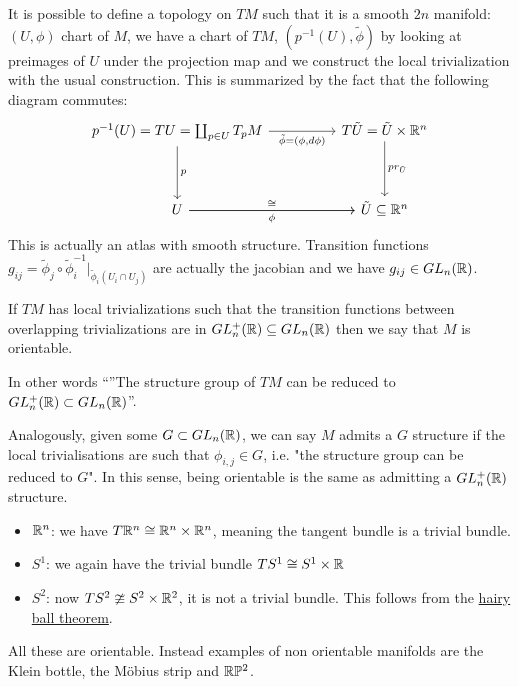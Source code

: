 \noindent It is possible to define a topology on $TM$ such that it is a smooth $2n$ manifold: $(U,\phi)$ chart of $M$, we have a chart of $TM$, $(p^{-1}(U),\tilde\phi)$ by looking at preimages of $U$ under the projection map and we construct the local trivialization with the usual construction. 
This is summarized by the fact that the following diagram commutes:
\[\begin{tikzcd}
    {p^{-1}(U)=TU=\coprod_{p\in U}T_pM} && {T\tilde U=\tilde U\times\R^n} \\
    \\
    U && {\tilde U\subseteq\R^n}
    \arrow["p", from=1-1, to=3-1]
    \arrow["{\tilde\phi=(\phi,d\phi)}"', from=1-1, to=1-3]
    \arrow["pr_{\tilde U}", from=1-3, to=3-3]
    \arrow["\phi"', from=3-1, to=3-3]
    \arrow["\cong", from=3-1, to=3-3]
\end{tikzcd}\]
This is actually an atlas with smooth structure. Transition functions $g_{ij} = \tilde \phi_j \circ \tilde\phi_i^{-1}|_{\tilde \phi_i(U_i \cap U_j)}$ are actually the jacobian and we have $g_{ij} \in GL_n(\mathbb{R})$. 

\begin{defn}
    If $TM$ has local trivializations such that the transition functions between overlapping trivializations are in $ GL_n^+(\mathbb{R})\subseteq GL_n(\mathbb{R})$ then we say that $M$ is orientable.

    \noindent In other words ``''The structure group of $TM$ can be reduced to $GL_n^+ (\mathbb{R}) \subset GL_n(\mathbb{R})$''.
    
    \noindent Analogously, given some $G \subset GL_n(\mathbb{R})$, we can say $M$ admits a $G$ structure if the local trivialisations are such that $\phi_{i,j} \in G$, i.e. "the structure group can be reduced to $G$". In this sense, being orientable is the same as admitting a $GL_n^+ (\mathbb{R})$ structure.

\end{defn}


\begin{ex}
\hfill
    \begin{itemize}
        \item $\mathbb{R}^n$: we have $T\mathbb{R}^n \cong \mathbb{R}^n \times \mathbb{R}^n$, meaning the tangent bundle is a trivial bundle.
        \item $S^1$: we again have the trivial bundle $TS^1 \cong S^1 \times \mathbb{R}$
        \item $S^2$: now $TS^2 \ncong S^2 \times \mathbb{R}^2$, it is not a trivial bundle. This follows from the \href{https://en.wikipedia.org/wiki/Hairy_ball_theorem}{hairy ball theorem}. 
    \end{itemize}
    All these are orientable. Instead examples of non orientable manifolds are the Klein bottle, the Möbius strip and $\mathbb{R}\mathbb{P}^2$.
\end{ex}

